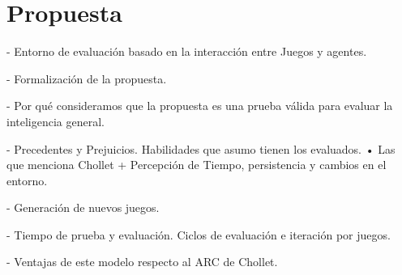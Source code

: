 \chapter{Propuesta}\label{chapter:proposal}

- Entorno de evaluación basado en la interacción entre Juegos y agentes.

- Formalización de la propuesta. 

- Por qué consideramos que la propuesta es una prueba válida para evaluar la inteligencia general.

- Precedentes y Prejuicios. Habilidades que asumo tienen los evaluados.
• Las que menciona Chollet
+ Percepción de Tiempo, persistencia y cambios en el entorno.

- Generación de nuevos juegos.

- Tiempo de prueba y evaluación. Ciclos de evaluación e iteración por juegos.

- Ventajas de este modelo respecto al ARC de Chollet.
